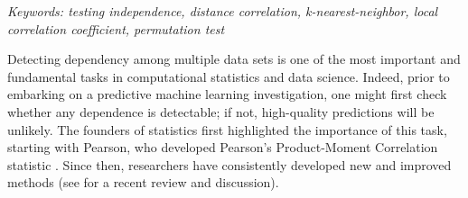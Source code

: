 \documentclass[11pt]{article}
\begin{document}
\noindent%
{\it Keywords: testing independence, distance correlation, k-nearest-neighbor, local correlation coefficient, permutation test}

\setcounter{tocdepth}{2}%
{\small\tableofcontents}





\newpage
{}



Detecting dependency among multiple data sets is one of the most important and fundamental tasks in computational statistics and data science.
Indeed, prior to embarking on a predictive machine learning investigation, one might first check whether any dependence is detectable; if not, high-quality predictions will be unlikely.
The founders of statistics first highlighted the importance of this task, starting with Pearson, who developed Pearson's Product-Moment Correlation statistic  \cite{Pearson1895}.  Since then, researchers have consistently developed new and improved methods (see \cite{Reimherr2013} for a recent review and discussion).
\end{document}
